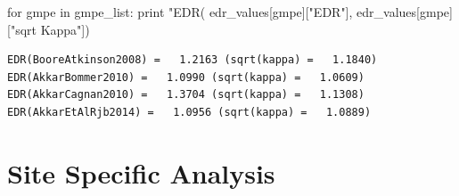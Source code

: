 \begin{python}
for gmpe in gmpe_list:
    print "EDR(%
        edr_values[gmpe]["EDR"], edr_values[gmpe]["sqrt Kappa"])
\end{python}

\begin{verbatim}
EDR(BooreAtkinson2008) =   1.2163 (sqrt(kappa) =   1.1840)
EDR(AkkarBommer2010) =   1.0990 (sqrt(kappa) =   1.0609)
EDR(AkkarCagnan2010) =   1.3704 (sqrt(kappa) =   1.1308)
EDR(AkkarEtAlRjb2014) =   1.0956 (sqrt(kappa) =   1.0889)
\end{verbatim}

\section{Site Specific Analysis}
\label{sec:site}